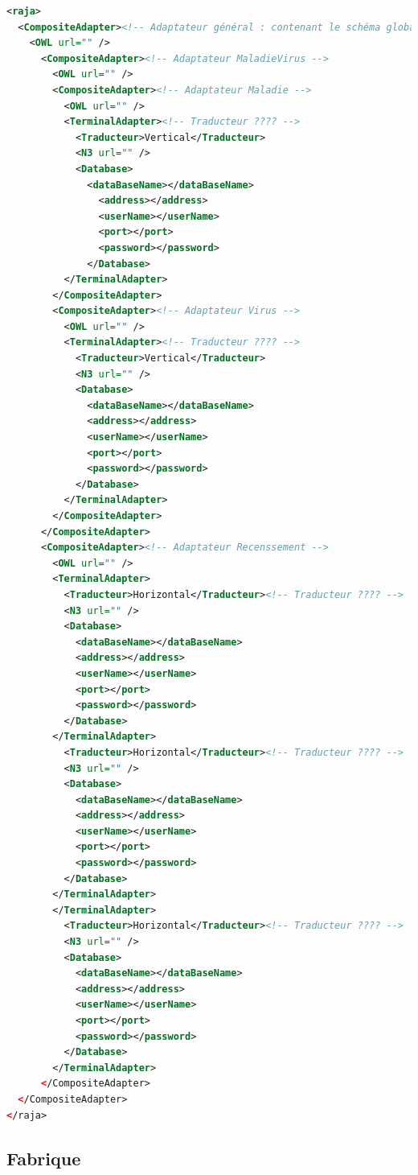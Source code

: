 \documentclass[12pt]{article}
\begin{document}
\begin{lstlisting}[language=XML]
<raja>
  <CompositeAdapter><!-- Adaptateur général : contenant le schéma global -->
    <OWL url="" />
      <CompositeAdapter><!-- Adaptateur MaladieVirus -->
        <OWL url="" />
        <CompositeAdapter><!-- Adaptateur Maladie -->
          <OWL url="" />
          <TerminalAdapter><!-- Traducteur ???? -->
            <Traducteur>Vertical</Traducteur>
            <N3 url="" />
            <Database>
              <dataBaseName></dataBaseName>
                <address></address>
                <userName></userName>
                <port></port>
                <password></password>
              </Database>
          </TerminalAdapter>
        </CompositeAdapter>
        <CompositeAdapter><!-- Adaptateur Virus -->
          <OWL url="" />
          <TerminalAdapter><!-- Traducteur ???? -->
            <Traducteur>Vertical</Traducteur>
            <N3 url="" />
            <Database>
              <dataBaseName></dataBaseName>
              <address></address>
              <userName></userName>
              <port></port>
              <password></password>
            </Database>
          </TerminalAdapter>
        </CompositeAdapter>
      </CompositeAdapter>
      <CompositeAdapter><!-- Adaptateur Recenssement -->
        <OWL url="" />
        <TerminalAdapter>
          <Traducteur>Horizontal</Traducteur><!-- Traducteur ???? -->
          <N3 url="" />
          <Database>
            <dataBaseName></dataBaseName>
            <address></address>
            <userName></userName>
            <port></port>
            <password></password>
          </Database>
        </TerminalAdapter>
          <Traducteur>Horizontal</Traducteur><!-- Traducteur ???? -->
          <N3 url="" />
          <Database>
            <dataBaseName></dataBaseName>
            <address></address>
            <userName></userName>
            <port></port>
            <password></password>
          </Database>
        </TerminalAdapter>
        </TerminalAdapter>
          <Traducteur>Horizontal</Traducteur><!-- Traducteur ???? -->
          <N3 url="" />
          <Database>
            <dataBaseName></dataBaseName>
            <address></address>
            <userName></userName>
            <port></port>
            <password></password>
          </Database>
        </TerminalAdapter>
      </CompositeAdapter>
  </CompositeAdapter>
</raja>
\end{lstlisting}

\subsection{Fabrique}
\end{document}
